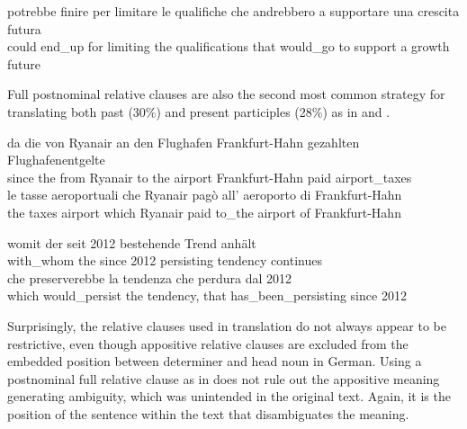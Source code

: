 \documentclass[output=paper,colorlinks,citecolor=brown]{langscibook}
\begin{document}
\ex \gll potrebbe  finire  per  limitare  le  qualifiche  che  andrebbero       a  supportare  una  crescita  futura             \\
       could  end\_up  for  limiting  the  qualifications  that  would\_go       to  support  a  growth  future       \\
    \z
\z



Full postnominal relative clauses are also the second most common strategy for translating both past (30\%) and present participles (28\%) as in  and .

\ea%
    \label{ex:resi:38}
\ea \gll da  die  von  Ryanair  an  den  Flughafen  Frankfurt-Hahn  gezahlten  Flughafenentgelte  \\
   since  the  from  Ryanair  to  the  airport  Frankfurt-Hahn  paid  airport\_taxes         \\

\ex \gll le  tasse  aeroportuali  che  Ryanair  pagò  all’  aeroporto  di  Frankfurt-Hahn  \\
    the  taxes  airport      which  Ryanair  paid  to\_the  airport  of  Frankfurt-Hahn  \\
    \z
\z



\ea%
    \label{ex:resi:39}
\ea \gll womit        der  seit  2012  bestehende  Trend  anhält       \\
    with\_whom  the  since  2012  persisting  tendency  continues  \\

\ex \gll che  preserverebbe      la  tendenza  che  perdura  dal  2012\\
     which  would\_persist  the  tendency,  that  has\_been\_persisting  since  2012\\
    \z
\z





Surprisingly, the relative clauses used in translation do not always appear to be restrictive, even though appositive relative clauses are excluded from the embedded position between determiner and head noun in German. Using a postnominal full relative clause as in  does not rule out the appositive meaning generating ambiguity, which was unintended in the original text. Again, it is the position of the sentence within the text that disambiguates the meaning.
\end{document}
